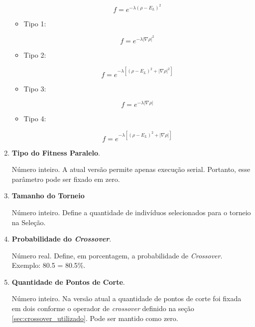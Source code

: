 \begin{enumerate}
\begin{itemize}
					\begin{equation}
					f = e^{-\lambda(\rho - E_L)^2}
					\end{equation}
				
				\item Tipo 1:
				
					\begin{equation}
					f = e^{-\lambda |\nabla \rho|^2}
					\end{equation}
					
				\item Tipo 2:
				
					\begin{equation}
					f = e^{-\lambda [(\rho - E_L)^2 + |\nabla \rho|^2]}
					\end{equation}
					
				\item Tipo 3:
				
					\begin{equation}
					f = e^{-\lambda |\nabla \rho|}
					\end{equation}
		
			\item Tipo 4:
				
					\begin{equation}
					f = e^{-\lambda [(\rho - E_L)^2 + |\nabla \rho|]}
					\end{equation}
			\end{itemize}
			
		\item \textbf{Tipo do Fitness Paralelo}.
		
				Número inteiro. A atual versão permite apenas execução serial. Portanto, esse parâmetro pode ser fixado em zero.
		
		\item \textbf{Tamanho do Torneio}
		
			Número inteiro. Define a quantidade de indivíduos selecionados para o torneio na Seleção.
		
		\item \textbf{Probabilidade do \emph{Crossover}}.
		
			Número real. Define, em porcentagem, a probabilidade de \emph{Crossover}. Exemplo: 80.5 = 80.5\%.
		
		\item \textbf{Quantidade de Pontos de Corte}.
		
			Número inteiro. Na versão atual a quantidade de pontos de corte foi fixada em dois conforme o operador de \emph{crossover} definido na seção \ref{sec:crossover_utilizado}. Pode ser mantido como zero.
		

\end{enumerate}
